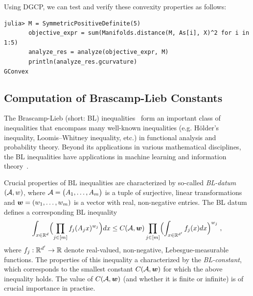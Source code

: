 \documentclass[twoside,11pt]{article}
\begin{document}
Using DGCP, we can test and verify these convexity properties as follows:

\begin{listing}[h!]
    \begin{verbatim}
julia> M = SymmetricPositiveDefinite(5)
       objective_expr = sum(Manifolds.distance(M, As[i], X)^2 for i in 1:5)
       analyze_res = analyze(objective_expr, M)
       println(analyze_res.gcurvature)
GConvex
    \end{verbatim}
\end{listing}


\subsection{Computation of Brascamp-Lieb Constants}
The Brascamp-Lieb (short: BL) inequalities~\citep{BL1,BL2} form an important class of inequalities that encompass many well-known inequalities (e.g.  Hölder's inequality,  Loomis–Whitney inequality, etc.) in functional analysis and probability theory. Beyond its applications in various mathematical disciplines, the BL inequalities have applications in machine learning and information theory~\citep{dvir2016rank,pmlr-v30-Hardt13,carlen2009subadditivity,liu2016smoothing}.

Crucial properties of BL inequalities are characterized by so-called  \emph{BL-datum} $(\mathcal{A},w)$, where $\mathcal{A} = \big( A_1, \dots, A_m \big)$ is a tuple of surjective, linear transformations and  $\boldsymbol{w}=(w_1,\dots,w_m)$ is a vector with real, non-negative entries. The BL datum defines a corresponding BL inequality 
\begin{equation}\label{eq:BL-inequ}
\int_{x \in \mathbb{R}^d} \Bigl( \prod_{j \in [m]} f_j (A_j x)^{w_j} \Bigr) dx 
\leq C(\mathcal{A},\boldsymbol{w}) \prod_{j \in [m]} \Bigl( \int_{x \in \mathbb{R}^{d'}} f_j (x) dx	\Bigr)^{w_j} \; ,
\end{equation}
where $f_j: \mathbb{R}^{d'} \rightarrow \mathbb{R}$ denote real-valued, non-negative, Lebesgue-measurable functions. The properties of this inequality a characterized by the \emph{BL-constant}, which corresponds to the smallest constant $C(\mathcal{A},\boldsymbol{w})$ for which the above inequality holds. The value of $C(\mathcal{A},\boldsymbol{w})$ (and whether it is finite or infinite) is of crucial importance in practise. 
\end{document}
